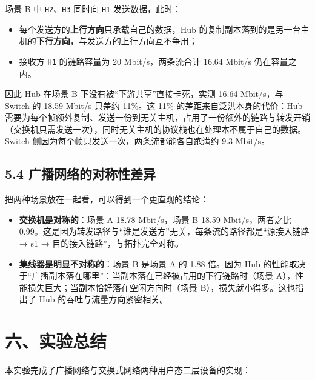 \documentclass[UTF8,12pt,a4paper,fontset=fandol]{ctexart}
\begin{document}
场景 B 中 \texttt{H2}、\texttt{H3} 同时向 \texttt{H1} 发送数据，此时：

\begin{itemize}[leftmargin=1.7em]
  \item 每个发送方的\textbf{上行方向}只承载自己的数据，Hub 的复制副本落到的是另一台主机的\textbf{下行方向}，与发送方的上行方向互不争用；
  \item 接收方 \texttt{H1} 的链路容量为 20 Mbit/s，两条流合计 16.64 Mbit/s 仍在容量之内。
\end{itemize}

因此 Hub 在场景 B 下没有被“下游共享”直接卡死，实测 16.64 Mbit/s，与 Switch 的 18.59 Mbit/s 只差约 11\%。这 11\% 的差距来自泛洪本身的代价：Hub 需要为每个帧额外复制、发送一份到无关主机，占用了一份额外的链路与转发开销（交换机只需发送一次），同时无关主机的协议栈也在处理本不属于自己的数据。Switch 侧因为每个帧只发送一次，两条流都能各自跑满约 9.3 Mbit/s。

\subsection*{5.4 广播网络的对称性差异}

把两种场景放在一起看，可以得到一个更直观的结论：

\begin{itemize}[leftmargin=1.7em]
  \item \textbf{交换机是对称的}：场景 A 18.78 Mbit/s，场景 B 18.59 Mbit/s，两者之比 0.99。这是因为转发路径与“谁是发送方”无关，每条流的路径都是“源接入链路 → s1 → 目的接入链路”，与拓扑完全对称。
  \item \textbf{集线器是明显不对称的}：场景 B 是场景 A 的 1.88 倍。因为 Hub 的性能取决于“广播副本落在哪里”：当副本落在已经被占用的下行链路时（场景 A），性能损失巨大；当副本恰好落在空闲方向时（场景 B），损失就小得多。这也指出了 Hub 的吞吐与流量方向紧密相关。
\end{itemize}

\section*{六、实验总结}

本实验完成了广播网络与交换式网络两种用户态二层设备的实现：
\end{document}
